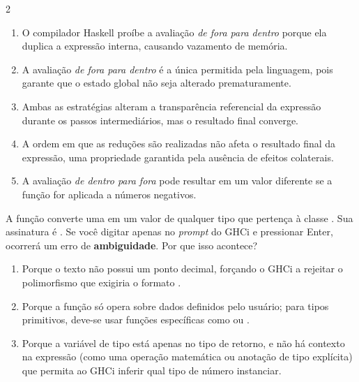 \documentclass[a4paper,10pt,brazil]{article}
\begin{document}
\begin{multicols}{2}
\begin{enumerate}
  \item O compilador Haskell proíbe a avaliação \emph{de fora para dentro} porque ela duplica a expressão interna, causando vazamento de memória.

  \item A avaliação \emph{de fora para dentro} é a única permitida pela linguagem, pois garante que o estado global não seja alterado prematuramente.

  \item Ambas as estratégias alteram a transparência referencial da expressão durante os passos intermediários, mas o resultado final converge.

  \item A ordem em que as reduções são realizadas não afeta o resultado final da expressão, uma propriedade garantida pela ausência de efeitos colaterais.

  \item A avaliação \emph{de dentro para fora} pode resultar em um valor diferente se a função  for aplicada a números negativos.


\end{enumerate}

A função  converte uma  em um valor de qualquer tipo que pertença à classe . Sua assinatura é . 
Se você digitar apenas  no \emph{prompt} do GHCi e pressionar Enter, ocorrerá um erro de \textbf{ambiguidade}. Por que isso acontece?

\begin{enumerate}
  \item Porque o texto  não possui um ponto decimal, forçando o GHCi a rejeitar o polimorfismo que exigiria o formato .

  \item Porque a função  só opera sobre dados definidos pelo usuário; para tipos primitivos, deve-se usar funções específicas como  ou .

  \item Porque a variável de tipo  está apenas no tipo de retorno, e não há contexto na expressão (como uma operação matemática ou anotação de tipo explícita) que permita ao GHCi inferir qual tipo de número instanciar.


\end{enumerate}
\end{multicols}
\end{document}
